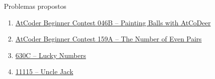 \begin{frame}[fragile]{Problemas propostos}

    \begin{enumerate}
        \item \href{https://atcoder.jp/contests/abc046/tasks/abc046_b}{AtCoder Beginner Contest 
            046B -- Painting Balls with AtCoDeer}

        \item \href{https://atcoder.jp/contests/abc159/tasks/abc159_a}{AtCoder Beginner Contest
            159A -- The Number of Even Pairs}

        \item \href{https://codeforces.com/problemset/problem/630/C}{630C -- Lucky Numbers}
        \item \href{https://onlinejudge.org/index.php?option=com_onlinejudge&Itemid=8&category=24&page=show_problem&problem=2056}{11115 -- Uncle Jack}
    \end{enumerate}

\end{frame}
